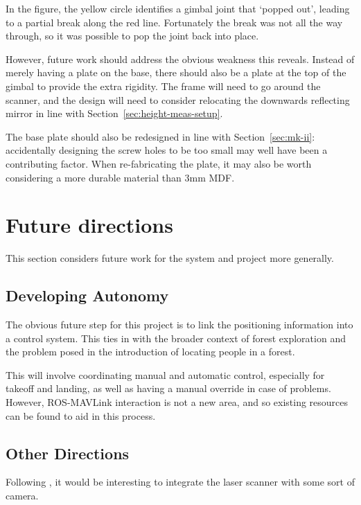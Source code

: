 \documentclass[12pt,oneside,a4paper]{book}
\begin{document}
In the figure, the yellow circle identifies a gimbal joint that
`popped out', leading to a partial break along the red
line. Fortunately the break was not all the way through, so it was
possible to pop the joint back into place.

However, future work should address the obvious weakness this
reveals. Instead of merely having a plate on the base, there should
also be a plate at the top of the gimbal to provide the extra
rigidity. The frame will need to go around the scanner, and the design
will need to consider relocating the downwards reflecting mirror in
line with Section~\ref{sec:height-meas-setup}.

The base plate should also be redesigned in line with
Section~\ref{sec:mk-ii}: accidentally designing the screw holes to be
too small may well have been a contributing factor. When re-fabricating
the plate, it may also be worth considering a more durable material
than 3mm MDF.

\section{Future directions}
\label{sec:future-work}

This section considers future work for the system and project more
generally.

\subsection{Developing Autonomy}
\label{sec:developing-autonomy}

The obvious future step for this project is to link the positioning
information into a control system. This ties in with the broader
context of forest exploration and the problem posed in the
introduction of locating people in a forest.

This will involve coordinating manual and automatic control,
especially for takeoff and landing, as well as having a manual
override in case of problems. However, ROS-MAVLink interaction is not
a new area, and so existing resources can be found to aid in this process.

\subsection{Other Directions}
\label{sec:other-directions}

Following \cite{achtelik2009stereo}, it would be interesting to
integrate the laser scanner with some sort of camera.
\end{document}
